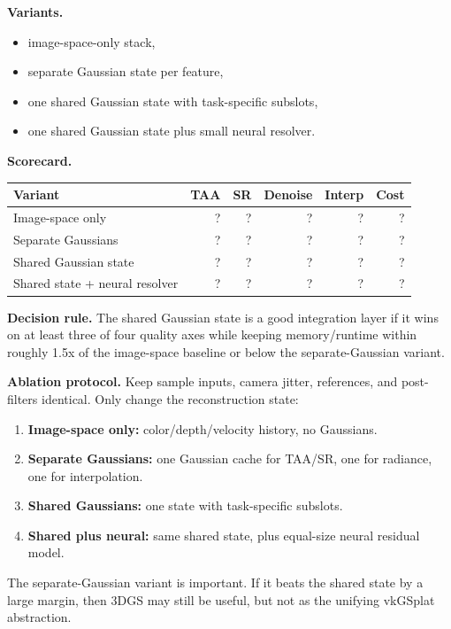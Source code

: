 \documentclass[11pt]{article}
\begin{document}
\textbf{Variants.}

\begin{itemize}
  \item image-space-only stack,
  \item separate Gaussian state per feature,
  \item one shared Gaussian state with task-specific subslots,
  \item one shared Gaussian state plus small neural resolver.
\end{itemize}

\textbf{Scorecard.}

\begin{center}
\begin{tabular}{lrrrrr}
\toprule
Variant & TAA & SR & Denoise & Interp & Cost \\
\midrule
Image-space only & ? & ? & ? & ? & ? \\
Separate Gaussians & ? & ? & ? & ? & ? \\
Shared Gaussian state & ? & ? & ? & ? & ? \\
Shared state + neural resolver & ? & ? & ? & ? & ? \\
\bottomrule
\end{tabular}
\end{center}

\textbf{Decision rule.} The shared Gaussian state is a good integration layer
if it wins on at least three of four quality axes while keeping memory/runtime
within roughly 1.5x of the image-space baseline or below the separate-Gaussian
variant.

\textbf{Ablation protocol.} Keep sample inputs, camera jitter, references, and
post-filters identical. Only change the reconstruction state:

\begin{enumerate}
  \item \textbf{Image-space only:} color/depth/velocity history, no Gaussians.
  \item \textbf{Separate Gaussians:} one Gaussian cache for TAA/SR, one for
        radiance, one for interpolation.
  \item \textbf{Shared Gaussians:} one state with task-specific subslots.
  \item \textbf{Shared plus neural:} same shared state, plus equal-size neural
        residual model.
\end{enumerate}

The separate-Gaussian variant is important. If it beats the shared state by a
large margin, then 3DGS may still be useful, but not as the unifying vkGSplat
abstraction.
\end{document}

